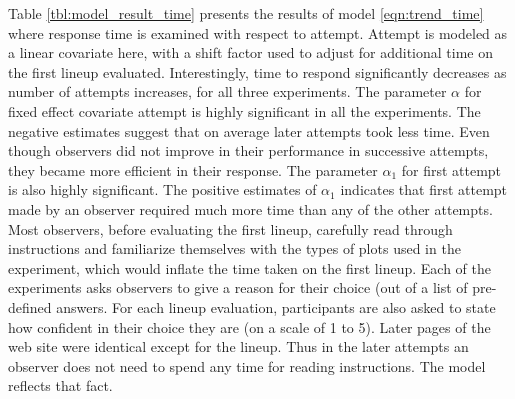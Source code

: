 \documentclass[10pt]{article}\usepackage[]{graphicx}\usepackage[]{color}
\begin{document}
Table \ref{tbl:model_result_time} presents the results of model \eqref{eqn:trend_time} where response time is examined with respect to attempt. Attempt is modeled as a linear covariate here, with a shift factor used to adjust for additional time on the first lineup evaluated. Interestingly, time to respond significantly decreases as number of attempts increases, for all three experiments. 
The parameter $\alpha$ for fixed effect covariate attempt is highly significant in all the experiments. The negative estimates suggest that on average later attempts took less time. Even though observers did not improve in their performance in successive attempts, they became more efficient in their response. The parameter $\alpha_1$ for first attempt is also highly significant. The positive estimates of $\alpha_1$ indicates that first attempt made by an observer required much more time than any of the other attempts. Most observers, before evaluating the first lineup, carefully read through instructions and familiarize themselves  with the types of plots used in the experiment, which would inflate the time taken on the first lineup. Each of the experiments asks observers to give a reason for their choice (out of a list of pre-defined answers. For each lineup evaluation, participants are also asked to state how confident in their choice they are (on a scale of 1 to 5).  Later pages of the web site were identical  except for the lineup. Thus in the later attempts an observer does not need to spend any time for reading instructions. The model reflects that fact.
\end{document}
